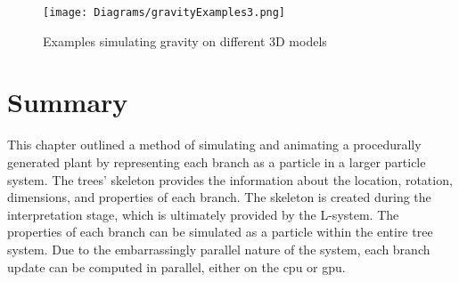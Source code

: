 \begin{figure}[htbp]
	{\centering
		\vspace{7px}
		\texttt{[image: Diagrams/gravityExamples3.png]}
		\label{3DAxisFigure} \label{Gravity applied to generated models}
		\caption{Examples simulating gravity on different 3D models}
	}
\end{figure}
\FloatBarrier

\section{Summary}

This chapter outlined a method of simulating and animating a procedurally generated plant by representing each branch as a  particle in a larger particle system. The trees' skeleton provides the information about the location, rotation, dimensions, and properties of each branch. The skeleton is created during the interpretation stage, which is ultimately provided by the L-system. The properties of each branch can be simulated as a particle within the entire tree system. Due to the embarrassingly parallel nature of the system, each branch update can be computed in parallel, either on the \acrshort{cpu} or \acrshort{gpu}.    

